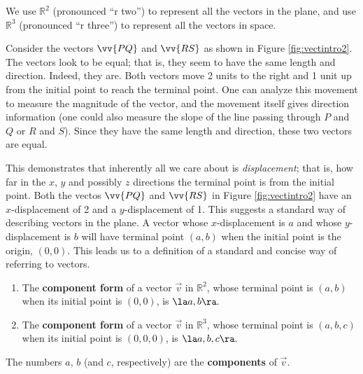 
We use $\mathbb{R}^2$ (pronounced ``r two'') to represent all the vectors in the plane, and use $\mathbb{R}^3$ (pronounced ``r three'') to represent all the vectors in space.

Consider the vectors $\vv{PQ}$ and $\vv{RS}$ as shown in Figure \ref{fig:vectintro2}. The vectors look to be equal; that is, they seem to have the same length and direction. Indeed, they are. Both vectors move 2 units to the right and 1 unit up from the initial point to reach the terminal point. One can analyze this movement to measure the magnitude of the vector, and the movement itself gives direction information (one could also measure the slope of the line passing through $P$ and $Q$ or $R$ and $S$). Since they have the same length and direction, these two vectors are equal.

This demonstrates that inherently all we care about is \textit{displacement}; that is, how far in the $x$, $y$ and possibly $z$ directions the terminal point is from the initial point. Both the vectos $\vv{PQ}$ and $\vv{RS}$ in Figure \ref{fig:vectintro2} have an $x$-displacement of 2 and a $y$-displacement of 1. This suggests a standard way of describing vectors in the plane. A vector whose $x$-displacement is $a$ and whose $y$-displacement is $b$ will have terminal point $(a,b)$ when the initial point is the origin, $(0,0)$. This leads us to a definition of a standard and concise way of referring to vectors.

{\begin{enumerate}
	\item The \textbf{component form} of a vector $\vec{v}$ in $\mathbb{R}^2$, whose terminal point is $(a,b)$ when its initial point is $(0,0)$, is $\la a,b\ra.$ 
	
	\item	The \textbf{component form} of a vector $\vec{v}$ in $\mathbb{R}^3$, whose terminal point is $(a,b,c)$ when its initial point is $(0,0,0)$, is $\la a,b,c\ra.$ 
	
\end{enumerate}
The numbers $a$, $b$ (and $c$, respectively) are the \textbf{components} of $\vec v$.
}

